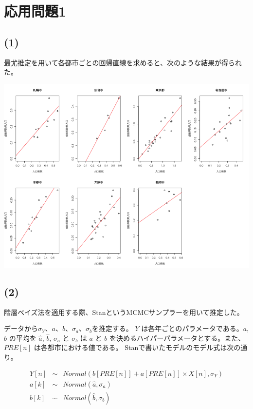 \documentclass[a4paper,xelatex,ja=standard,jafont=hiragino-pron, 9pt]{bxjsarticle}
\let\origfigure=\figure
\let\endorigfigure=\endfigure
\renewenvironment{figure}[1][]{%
  \origfigure[H]
}{%
  \endorigfigure
}
\begin{document}
\section*{応用問題1}

\subsection*{(1)}\label{section}

最尤推定を用いて各都市ごとの回帰直線を求めると、次のような結果が得られた。

\begin{figure}
\centering
\includegraphics[width=14.00000cm]{../src/output/image/regression.png}
\caption{最尤推定法による推定}
\end{figure}

\subsection*{(2)}

階層ベイズ法を適用する際、StanというMCMCサンプラーを用いて推定した。

データから\(\sigma_Y\)、\(a\)、\(b\)、\(\sigma_a\)、\(\sigma_b\)を推定する。
\(Y\) は各年ごとのパラメータである。\(a\), \(b\) の平均を \(\hat{a}\),
\(\hat{b}\), \(\sigma_a\) と \(\sigma_b\) は \(a\) と \(b\)
を決めるハイパーパラメータとする。また、 \(PRE[n]\)
は各都市における値である。 Stanで書いたモデルのモデル式は次の通り。

\begin{eqnarray}
  Y[n] &\sim& Normal(b[PRE[n]] + a[PRE[n]] \times X[n], \sigma_Y) \\
  a[k] &\sim& Normal(\hat{a}, \sigma_a) \\
  b[k] &\sim& Normal(\hat{b}, \sigma_b)
\end{eqnarray}
\end{document}

